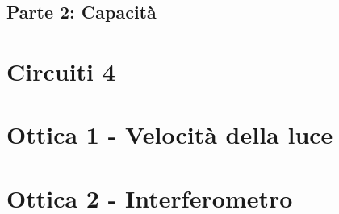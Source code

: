 \documentclass[11pt]{article}
\begin{document}
\subsection{Parte 2: Capacità}

\newpage







%
%
%

%
%

%




\section{Circuiti 4}





\newpage


\section{Ottica 1 - Velocità della luce}






\newpage




\section{ Ottica 2 - Interferometro}





\end{document}
